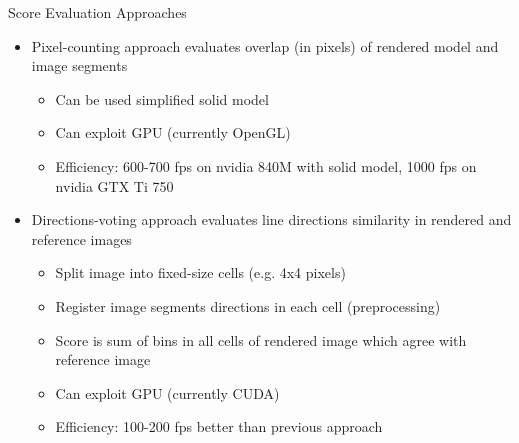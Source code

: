 \documentclass{beamer}
\begin{document}
\begin{frame}[t, fragile]{Score Evaluation Approaches}
\begin{itemize}
\item Pixel-counting approach evaluates overlap (in pixels) of rendered model and image segments
\begin{itemize}
\item Can be used simplified solid model
\item Can exploit GPU (currently OpenGL)
\item Efficiency: 600-700 fps on nvidia 840M with solid model, 1000 fps on nvidia GTX Ti 750
\end{itemize}
\item Directions-voting approach evaluates line directions similarity in rendered and reference images
\begin{itemize}
\item Split image into fixed-size cells (e.g. 4x4 pixels)
\item Register image segments directions in each cell (preprocessing)
\item Score is sum of bins in all cells of rendered image which agree with reference image
\item Can exploit GPU (currently CUDA)
\item Efficiency: 100-200 fps better than previous approach
 
\end{itemize}
\end{itemize}
\end{frame}
\end{document}
